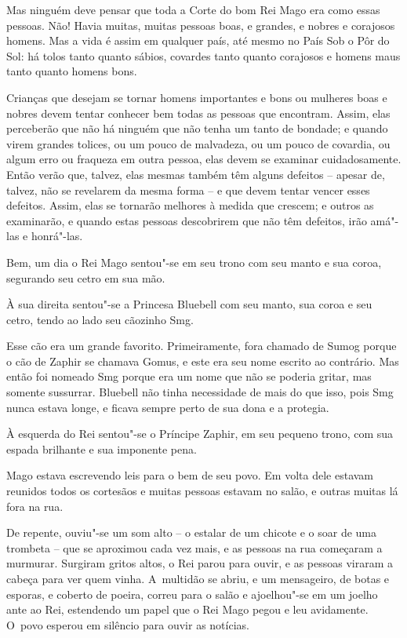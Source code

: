 Mas ninguém deve pensar que toda a Corte do bom Rei Mago era como essas
pessoas. Não! Havia muitas, muitas pessoas boas, e grandes, e nobres e
corajosos homens. Mas a vida é assim em qualquer país, até mesmo no País
Sob o Pôr do Sol: há tolos tanto quanto sábios, covardes tanto quanto
corajosos e homens maus tanto quanto homens bons.

Crianças que desejam se tornar homens importantes e bons ou mulheres
boas e nobres devem tentar conhecer bem todas as pessoas que encontram.
Assim, elas perceberão que não há ninguém que não tenha um tanto de
bondade; e quando virem grandes tolices, ou um pouco de malvadeza, ou um
pouco de covardia, ou algum erro ou fraqueza em outra pessoa, elas devem
se examinar cuidadosamente. Então verão que, talvez, elas mesmas também
têm alguns defeitos -- apesar de, talvez, não se revelarem da mesma
forma -- e que devem tentar vencer esses defeitos. Assim, elas se
tornarão melhores à medida que crescem; e outros as examinarão, e quando
estas pessoas descobrirem que não têm defeitos, irão amá"-las e
honrá"-las.

Bem, um dia o Rei Mago sentou"-se em seu trono com seu manto e sua coroa,
segurando seu cetro em sua mão.

À sua direita sentou"-se a Princesa Bluebell com seu manto, sua coroa e
seu cetro, tendo ao lado seu cãozinho Smg.

Esse cão era um grande favorito. Primeiramente, fora chamado de Sumog
porque o cão de Zaphir se chamava Gomus, e este era seu nome escrito ao
contrário. Mas então foi nomeado Smg porque era um nome que não se
poderia gritar, mas somente sussurrar. Bluebell não tinha necessidade de
mais do que isso, pois Smg nunca estava longe, e ficava sempre perto de
sua dona e a protegia.

À esquerda do Rei sentou"-se o Príncipe Zaphir, em seu pequeno trono, com
sua espada brilhante e sua imponente pena.

Mago estava escrevendo leis para o bem de seu povo. Em volta dele
estavam reunidos todos os cortesãos e muitas pessoas estavam no salão, e
outras muitas lá fora na rua.

De repente, ouviu"-se um som alto -- o estalar de um chicote e o soar de
uma trombeta -- que se aproximou cada vez mais, e as pessoas na rua
começaram a murmurar. Surgiram gritos altos, o Rei parou para ouvir, e
as pessoas viraram a cabeça para ver quem vinha. A~multidão se abriu, e
um mensageiro, de botas e esporas, e coberto de poeira, correu para o
salão e ajoelhou"-se em um joelho ante ao Rei, estendendo um papel que o
Rei Mago pegou e leu avidamente. O~povo esperou em silêncio para ouvir
as notícias.

